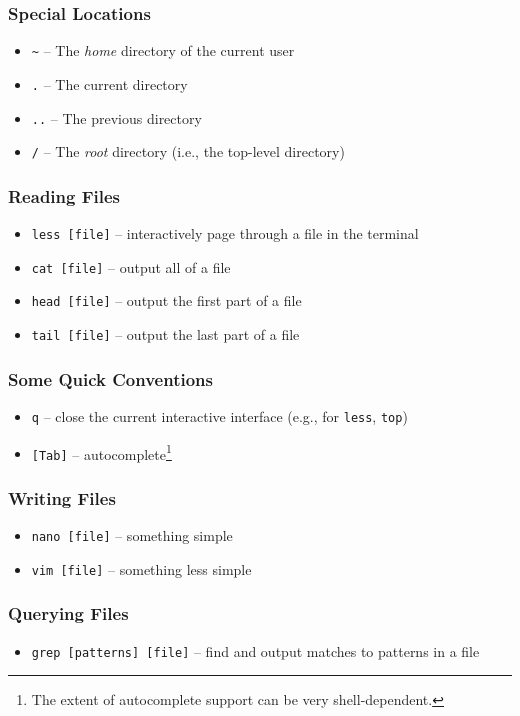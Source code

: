\documentclass[aspectratio=169]{beamer}
\begin{document}
\begin{frame}
	\frametitle{Special Locations}
	\begin{itemize}
		\item \texttt{\~} -- The \emph{home} directory of the current user
		\item \texttt{.} -- The current directory
		\item \texttt{..} -- The previous directory
		\item \texttt{/} -- The \emph{root} directory (i.e., the top-level directory)
	\end{itemize}
\end{frame}

\begin{frame}
	\frametitle{Reading Files}
	\begin{itemize}
		\item \texttt{less [file]} -- interactively page through a file in the terminal
		\item \texttt{cat [file]} -- output all of a file
		\item \texttt{head [file]} -- output the first part of a file
		\item \texttt{tail [file]} -- output the last part of a file
	\end{itemize}
\end{frame}

\begin{frame}
	\frametitle{Some Quick Conventions}
	\begin{itemize}
		\item \texttt{q} -- close the current interactive interface (e.g., for \texttt{less}, \texttt{top})
		\item \texttt{[Tab]} -- autocomplete\footnote{The extent of autocomplete support can be very shell-dependent.}
	\end{itemize}
\end{frame}

\begin{frame}
	\frametitle{Writing Files}
	\begin{itemize}
		\item \texttt{nano [file]} -- something simple
		\item \texttt{vim [file]} -- something less simple
	\end{itemize}
\end{frame}

\begin{frame}
	\frametitle{Querying Files}
	\begin{itemize}
		\item \texttt{grep [patterns] [file]} -- find and output matches to patterns in a file
	\end{itemize}
\end{frame}
\end{document}
